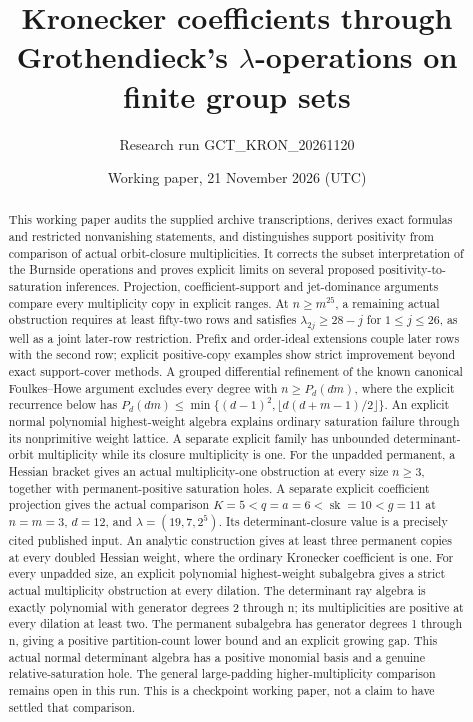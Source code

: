 \documentclass[11pt]{article}
\title{Kronecker coefficients through Grothendieck's\linebreak
\(\lambda\)-operations on finite group sets}
\author{Research run GCT\_KRON\_20261120}
\date{Working paper, 21 November 2026 (UTC)}
\begin{document}
\maketitle
\begin{abstract}
This working paper audits the supplied archive transcriptions, derives
exact formulas and restricted nonvanishing statements, and distinguishes
support positivity from comparison of actual orbit-closure multiplicities.
It corrects the subset interpretation of the Burnside operations and proves
explicit limits on several proposed positivity-to-saturation inferences.
Projection, coefficient-support and jet-dominance arguments compare every
multiplicity copy in explicit ranges. At \(n\geq m^{25}\), a remaining
actual obstruction requires at least fifty-two rows and satisfies
\(\lambda_{2j}\geq28-j\) for \(1\leq j\leq26\), as well as a
joint later-row restriction. Prefix and order-ideal extensions couple
later rows with the second row; explicit positive-copy examples show
strict improvement beyond exact support-cover methods. A grouped differential refinement of the
known canonical Foulkes--Howe argument excludes every degree with
\(n\geq P_d(dm)\), where the explicit recurrence below has
\(P_d(dm)\leq\min\{(d-1)^2,\lfloor d(d+m-1)/2\rfloor\}\).
An explicit normal polynomial highest-weight algebra explains ordinary
saturation failure through its nonprimitive weight lattice. A separate
explicit family has unbounded determinant-orbit multiplicity while its
closure multiplicity is one. For the unpadded permanent, a Hessian
bracket gives an actual multiplicity-one obstruction at every size
\(n\geq3\), together with permanent-positive saturation holes.
A separate explicit coefficient projection gives the actual comparison
\(K=5<q=a=6<\operatorname{sk}=10<g=11\) at
\(n=m=3\), \(d=12\), and \(\lambda=(19,7,2^5)\).
Its determinant-closure value is a precisely cited published input.
An analytic construction gives at least three permanent copies at every
doubled Hessian weight, where the ordinary Kronecker coefficient is one.
For every unpadded size, an explicit polynomial highest-weight subalgebra
gives a strict actual multiplicity obstruction at every dilation. The
determinant ray algebra is exactly polynomial with generator degrees
2 through n; its multiplicities are positive at every dilation at least
two. The permanent subalgebra has generator degrees 1 through n, giving
a positive partition-count lower bound and an explicit growing gap.
This actual normal determinant algebra has a positive monomial basis
and a genuine relative-saturation hole.
The general large-padding
higher-multiplicity comparison remains open in this run. This is a
checkpoint working paper, not a claim to have settled that comparison.
\end{abstract}
\end{document}
